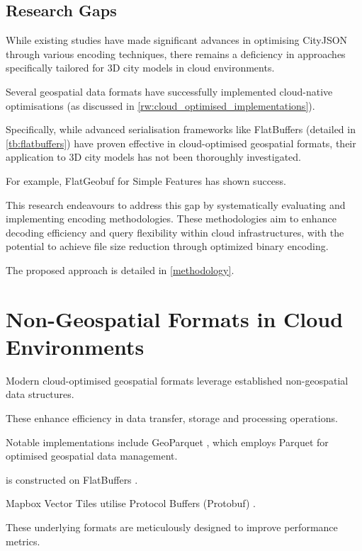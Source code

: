 \subsection{Research Gaps}
\label{rw:research_gaps}

While existing studies have made significant advances in optimising CityJSON through various encoding techniques, there remains a deficiency in approaches specifically tailored for 3D city models in cloud environments.

Several geospatial data formats have successfully implemented cloud-native optimisations (as discussed in \autoref{rw:cloud_optimised_implementations}).

Specifically, while advanced serialisation frameworks like FlatBuffers (detailed in \autoref{tb:flatbuffers}) have proven effective in cloud-optimised geospatial formats, their application to 3D city models has not been thoroughly investigated.

For example, FlatGeobuf for Simple Features \citep{flatgeobuf} has shown success.

This research endeavours to address this gap by systematically evaluating and implementing encoding methodologies.
These methodologies aim to enhance decoding efficiency and query flexibility within cloud infrastructures, with the potential to achieve file size reduction through optimized binary encoding.

The proposed approach is detailed in \autoref{methodology}.

\section{Non-Geospatial Formats in Cloud Environments}
\label{rw:non_geospatial_formats}

Modern cloud-optimised geospatial formats leverage established non-geospatial data structures.

These enhance efficiency in data transfer, storage and processing operations.

Notable implementations include GeoParquet \citep{geoparquet}, which employs Parquet \citep{parquet} for optimised geospatial data management.

\citet{flatgeobuf} is constructed on FlatBuffers \citep{flatbuffers}.

Mapbox Vector Tiles \citep{mapbox-vector-tiles} utilise Protocol Buffers (Protobuf) \citep{protobuf}.

These underlying formats are meticulously designed to improve performance metrics.

